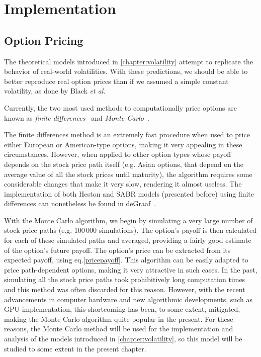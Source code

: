 \chapter{Implementation}
\label{chapter:implementation}
\section{Option Pricing}
\label{section:Option Pricing}
The theoretical models introduced in \autoref{chapter:volatility} attempt to replicate the behavior of real-world volatilities. With these predictions, we should be able to better reproduce real option prices than if we assumed a simple constant volatility, as done by Black \textit{et al.}

Currently, the two most used methods to computationally price options are known as \emph{finite differences}~\citep{Hull} and \emph{Monte Carlo}~\citep{Glasserman}.

The finite differences method is an extremely fast procedure when used to price either European or American-type options, making it very appealing in these circumstances. However, when applied to other option types whose payoff depends on the stock price path itself (e.g. Asian options, that depend on the average value of all the stock prices until maturity), the algorithm requires some considerable changes that make it very slow, rendering it almost useless.
The implementation of both Heston and SABR models (presented before) using finite differences can nonetheless be found in deGraaf~\citep{deGraaf}.


With the Monte Carlo algorithm, we begin by simulating a very large number of stock price paths (e.g. 100\,000 simulations). The option's payoff is then calculated for each of these simulated paths and averaged, providing a fairly good estimate of the option's future payoff. The option's price can be extracted from its expected payoff, using eq.\eqref{pricepayoff}. This algorithm can be easily adapted to price path-dependent options, making it very attractive in such cases.
In the past, simulating all the stock price paths took prohibitively long computation times and this method was often discarded for this reason. However, with the recent advancements in computer hardware and new algorithmic developments, such as GPU implementation, this shortcoming has been, to some extent, mitigated, making the Monte Carlo algorithm quite popular in the present.
For these reasons, the Monte Carlo method will be used for the implementation and analysis of the models introduced in \autoref{chapter:volatility}, so this model will be studied to some extent in the present chapter.


